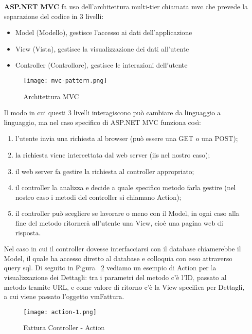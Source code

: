 \textbf{ASP.NET MVC} \cite{mvc} fa uso dell'architettura multi-tier chiamata \Gls{mvc} che prevede la separazione del codice in 3 livelli:
\begin{itemize}
    \item Model (Modello), gestisce l'accesso ai dati dell'applicazione
    \item View (Vista), gestisce la visualizzazione dei dati all'utente
    \item Controller (Controllore), gestisce le interazioni dell'utente
\end{itemize}

\begin{figure}[H]
    \centering
    \texttt{[image: mvc-pattern.png]}
    \caption{Architettura MVC}
    \label{fig:Mvc}
\end{figure}

Il modo in cui questi 3 livelli interagiscono può cambiare da linguaggio a linguaggio, ma nel caso specifico di ASP.NET MVC funziona così:
\begin{enumerate}
    \item l'utente invia una richiesta al browser (può essere una GET o una POST);
    \item la richiesta viene intercettata dal web server (\Gls{iis} nel nostro caso);
    \item il web server fa gestire la richiesta al controller appropriato;
    \item il controller la analizza e decide a quale specifico metodo farla gestire (nel nostro caso i metodi del controller si chiamano Action);
    \item il controller può scegliere se lavorare o meno con il Model, in ogni caso alla fine del metodo ritornerà all'utente una View, cioè una pagina web di risposta.
\end{enumerate}
Nel caso in cui il controller dovesse interfacciarsi con il database chiamerebbe il Model, il quale ha accesso diretto al database e colloquia con esso attraverso query \Gls{sql}.
Di seguito in Figura ~\ref{fig:Action1} vediamo un esempio di Action per la visualizzazione dei Dettagli: tra i parametri del metodo c'è l'ID, passato al metodo tramite URL, e come valore di ritorno c'è la View specifica per Dettagli, a cui viene passato l'oggetto vmFattura.

\begin{figure}[H]
    \centering
    \texttt{[image: action-1.png]}
    \caption{Fattura Controller - Action }
    \label{fig:Action1}
\end{figure}

